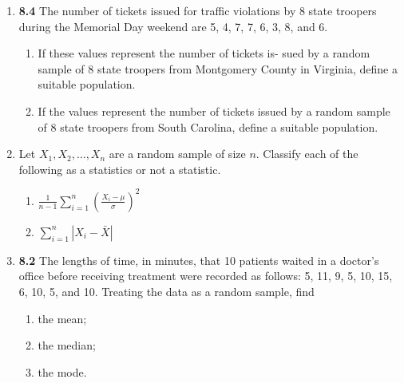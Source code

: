 \documentclass[basic, header]{nosvagor-notes}
\begin{document}
\begin{enumerate}[itemsep=4em]

  \item \textbf{8.4} The number of tickets issued for traffic violations by 8 state troopers
    during the Memorial Day weekend are 5, 4, 7, 7, 6, 3, 8, and 6.
    \begin{enumerate}

      \item If these values represent the number of tickets is- sued by a
        random sample of 8 state troopers from Montgomery County in Virginia,
        define a suitable population.

      \item  If the values represent the number of tickets issued by a random
        sample of 8 state troopers from South Carolina, define a suitable
        population.

    \end{enumerate}

  \item Let \(X_1, X_2,\ldots,X_n\) are a random sample of size \(n\). Classify
    each of the following as a statistics or not a statistic.
    \begin{enumerate}

      \item \(\displaystyle \frac{1}{n-1} \sum_{i=1}^{n} \left( \frac{X_i - \mu }{\sigma} \right)^2 \)

      \item \(\displaystyle \sum_{i=1}^{n} \left| X_i - \bar{X} \right|  \)

    \end{enumerate}

  \item \textbf{8.2} The lengths of time, in minutes, that 10 patients waited
    in a doctor’s office before receiving treatment were recorded as follows:
    5, 11, 9, 5, 10, 15, 6, 10, 5, and 10. Treating the data as a random
    sample, find
    \begin{enumerate}

      \item the mean;
      \item the median;
      \item the mode.

    \end{enumerate}

  \newpage %


\end{enumerate}
\end{document}
